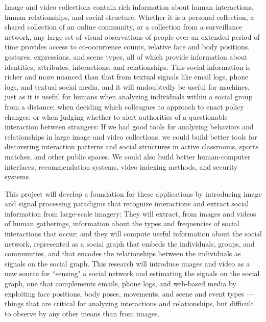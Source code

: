 \pagestyle{plain} 

 \label{sec:intro}


Image and video collections contain rich information about human interactions, human relationships, and social structure. Whether it is a personal collection, a shared collection of an online community, or a collection from a surveillance network, any large set of visual observations of people over an extended period of time provides access to co-occurrence counts, relative face and body positions, gestures, expressions, and scene types, all of which provide information about identities, attributes, interactions, and relationships. This social information is richer and more nuanced than that from textual signals like email logs, phone logs, and textual social media, and it will undoubtedly be useful for machines, just as it is useful for humans when analyzing individuals within a social group from a distance; when deciding which colleagues to approach to enact policy changes; or when judging whether to alert authorities of a questionable interaction between strangers: If we had good tools for analyzing behaviors and relationships in large image and video collections, we could build better tools for discovering interaction patterns and social structures in active classrooms, sports matches, and other public spaces. We could also build better human-computer interfaces, recommendation systems, video indexing methods, and security systems.
 
This project will develop a foundation for these applications by introducing image and signal processing paradigms that recognize interactions and extract social information from large-scale imagery: They will extract, from images and videos of human gatherings,  information about the types and frequencies of social interactions that occur; and they will compute useful information about the social network, represented as a social graph that embeds the individuals, groups, and communities, and that encodes the relationships between the individuals as signals on the social graph.  This research will introduce images and video as a new source for ``sensing" a social network and estimating the signals on the social graph, one that complements emails, phone logs, and web-based media by exploiting face positions, body poses, movements, and scene and event types --- things that are critical for analyzing interactions and relationships, but difficult to observe by any other means than from images.


